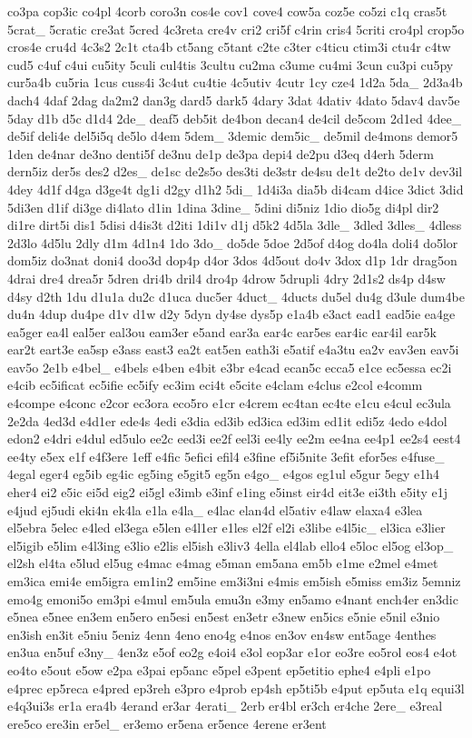 \begin{DoxyCompactItemize}
co3pa cop3ic co4pl 4corb coro3n cos4e cov1 cove4 cow5a coz5e co5zi c1q cras5t 5crat\-\_\- 5cratic cre3at 5cred 4c3reta cre4v cri2 cri5f c4rin cris4 5criti cro4pl crop5o cros4e cru4d 4c3s2 2c1t cta4b ct5ang c5tant c2te c3ter c4ticu ctim3i ctu4r c4tw cud5 c4uf c4ui cu5ity 5culi cul4tis 3cultu cu2ma c3ume cu4mi 3cun cu3pi cu5py cur5a4b cu5ria 1cus cuss4i 3c4ut cu4tie 4c5utiv 4cutr 1cy cze4 1d2a 5da\-\_\- 2d3a4b dach4 4daf 2dag da2m2 dan3g dard5 dark5 4dary 3dat 4dativ 4dato 5dav4 dav5e 5day d1b d5c d1d4 2de\-\_\- deaf5 deb5it de4bon decan4 de4cil de5com 2d1ed 4dee\-\_\- de5if deli4e del5i5q de5lo d4em 5dem\-\_\- 3demic dem5ic\-\_\- de5mil de4mons demor5 1den de4nar de3no denti5f de3nu de1p de3pa depi4 de2pu d3eq d4erh 5derm dern5iz der5s des2 d2es\-\_\- de1sc de2s5o des3ti de3str de4su de1t de2to de1v dev3il 4dey 4d1f d4ga d3ge4t dg1i d2gy d1h2 5di\-\_\- 1d4i3a dia5b di4cam d4ice 3dict 3did 5di3en d1if di3ge di4lato d1in 1dina 3dine\-\_\- 5dini di5niz 1dio dio5g di4pl dir2 di1re dirt5i dis1 5disi d4is3t d2iti 1di1v d1j d5k2 4d5la 3dle\-\_\- 3dled 3dles\-\_\- 4dless 2d3lo 4d5lu 2dly d1m 4d1n4 1do 3do\-\_\- do5de 5doe 2d5of d4og do4la doli4 do5lor dom5iz do3nat doni4 doo3d dop4p d4or 3dos 4d5out do4v 3dox d1p 1dr drag5on 4drai dre4 drea5r 5dren dri4b dril4 dro4p 4drow 5drupli 4dry 2d1s2 ds4p d4sw d4sy d2th 1du d1u1a du2c d1uca duc5er 4duct\-\_\- 4ducts du5el du4g d3ule dum4be du4n 4dup du4pe d1v d1w d2y 5dyn dy4se dys5p e1a4b e3act ead1 ead5ie ea4ge ea5ger ea4l eal5er eal3ou eam3er e5and ear3a ear4c ear5es ear4ic ear4il ear5k ear2t eart3e ea5sp e3ass east3 ea2t eat5en eath3i e5atif e4a3tu ea2v eav3en eav5i eav5o 2e1b e4bel\-\_\- e4bels e4ben e4bit e3br e4cad ecan5c ecca5 e1ce ec5essa ec2i e4cib ec5ificat ec5ifie ec5ify ec3im eci4t e5cite e4clam e4clus e2col e4comm e4compe e4conc e2cor ec3ora eco5ro e1cr e4crem ec4tan ec4te e1cu e4cul ec3ula 2e2da 4ed3d e4d1er ede4s 4edi e3dia ed3ib ed3ica ed3im ed1it edi5z 4edo e4dol edon2 e4dri e4dul ed5ulo ee2c eed3i ee2f eel3i ee4ly ee2m ee4na ee4p1 ee2s4 eest4 ee4ty e5ex e1f e4f3ere 1eff e4fic 5efici efil4 e3fine ef5i5nite 3efit efor5es e4fuse\-\_\- 4egal eger4 eg5ib eg4ic eg5ing e5git5 eg5n e4go\-\_\- e4gos eg1ul e5gur 5egy e1h4 eher4 ei2 e5ic ei5d eig2 ei5gl e3imb e3inf e1ing e5inst eir4d eit3e ei3th e5ity e1j e4jud ej5udi eki4n ek4la e1la e4la\-\_\- e4lac elan4d el5ativ e4law elaxa4 e3lea el5ebra 5elec e4led el3ega e5len e4l1er e1les el2f el2i e3libe e4l5ic\-\_\- el3ica e3lier el5igib e5lim e4l3ing e3lio e2lis el5ish e3liv3 4ella el4lab ello4 e5loc el5og el3op\-\_\- el2sh el4ta e5lud el5ug e4mac e4mag e5man em5ana em5b e1me e2mel e4met em3ica emi4e em5igra em1in2 em5ine em3i3ni e4mis em5ish e5miss em3iz 5emniz emo4g emoni5o em3pi e4mul em5ula emu3n e3my en5amo e4nant ench4er en3dic e5nea e5nee en3em en5ero en5esi en5est en3etr e3new en5ics e5nie e5nil e3nio en3ish en3it e5niu 5eniz 4enn 4eno eno4g e4nos en3ov en4sw ent5age 4enthes en3ua en5uf e3ny\-\_\- 4en3z e5of eo2g e4oi4 e3ol eop3ar e1or eo3re eo5rol eos4 e4ot eo4to e5out e5ow e2pa e3pai ep5anc e5pel e3pent ep5etitio ephe4 e4pli e1po e4prec ep5reca e4pred ep3reh e3pro e4prob ep4sh ep5ti5b e4put ep5uta e1q equi3l e4q3ui3s er1a era4b 4erand er3ar 4erati\-\_\- 2erb er4bl er3ch er4che 2ere\-\_\- e3real ere5co ere3in er5el\-\_\- er3emo er5ena er5ence 4erene er3ent 
\end{DoxyCompactItemize}

